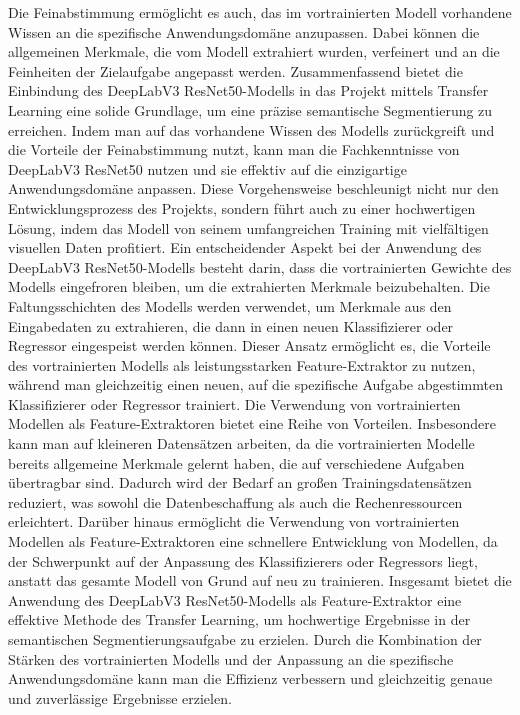    Die Feinabstimmung ermöglicht es auch, das im vortrainierten Modell vorhandene Wissen an die spezifische Anwendungsdomäne anzupassen.
    Dabei können die allgemeinen Merkmale, die vom Modell extrahiert wurden, verfeinert und an die Feinheiten der Zielaufgabe angepasst werden.
    Zusammenfassend bietet die Einbindung des DeepLabV3 ResNet50-Modells in das Projekt mittels Transfer Learning eine solide Grundlage, um eine präzise semantische Segmentierung zu erreichen. 
    Indem man auf das vorhandene Wissen des Modells zurückgreift und die Vorteile der Feinabstimmung nutzt, kann man die Fachkenntnisse von DeepLabV3 ResNet50 nutzen und sie effektiv auf die einzigartige Anwendungsdomäne anpassen. 
    Diese Vorgehensweise beschleunigt nicht nur den Entwicklungsprozess des Projekts, sondern führt auch zu einer hochwertigen Lösung, indem das Modell von seinem umfangreichen Training mit vielfältigen visuellen Daten profitiert.
    Ein entscheidender Aspekt bei der Anwendung des DeepLabV3 ResNet50-Modells besteht darin, dass die vortrainierten Gewichte des Modells eingefroren bleiben, um die extrahierten Merkmale beizubehalten. 
    Die Faltungsschichten des Modells werden verwendet, um Merkmale aus den Eingabedaten zu extrahieren, die dann in einen neuen Klassifizierer oder Regressor eingespeist werden können. 
    Dieser Ansatz ermöglicht es, die Vorteile des vortrainierten Modells als leistungsstarken Feature-Extraktor zu nutzen, während man gleichzeitig einen neuen, auf die spezifische Aufgabe abgestimmten Klassifizierer oder Regressor trainiert.
    Die Verwendung von vortrainierten Modellen als Feature-Extraktoren bietet eine Reihe von Vorteilen. Insbesondere kann man auf kleineren Datensätzen arbeiten, da die vortrainierten Modelle bereits allgemeine Merkmale gelernt haben, die auf verschiedene Aufgaben übertragbar sind. 
    Dadurch wird der Bedarf an großen Trainingsdatensätzen reduziert, was sowohl die Datenbeschaffung als auch die Rechenressourcen erleichtert. 
    Darüber hinaus ermöglicht die Verwendung von vortrainierten Modellen als Feature-Extraktoren eine schnellere Entwicklung von Modellen, da der Schwerpunkt auf der Anpassung des Klassifizierers oder Regressors liegt, anstatt das gesamte Modell von Grund auf neu zu trainieren.
    Insgesamt bietet die Anwendung des DeepLabV3 ResNet50-Modells als Feature-Extraktor eine effektive Methode des Transfer Learning, um hochwertige Ergebnisse in der semantischen Segmentierungsaufgabe zu erzielen. 
    Durch die Kombination der Stärken des vortrainierten Modells und der Anpassung an die spezifische Anwendungsdomäne kann man die Effizienz verbessern und gleichzeitig genaue und zuverlässige Ergebnisse erzielen.